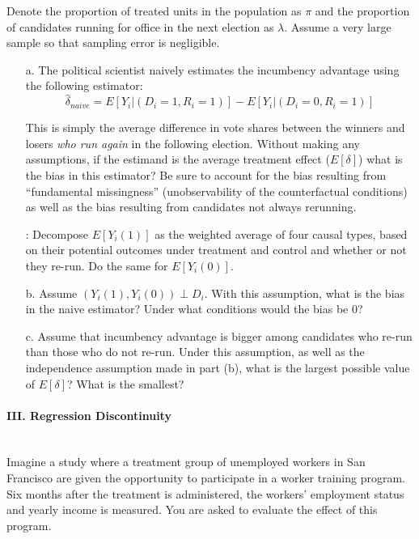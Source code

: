 \documentclass{article}
\begin{document}
Denote the proportion of treated units in the population as $\pi$ and the
proportion of candidates running for office in the next election as
$\lambda$. Assume a very large sample so that sampling error is negligible.

\begin{itemize}
\item[a.]  The political scientist naively estimates the incumbency
  advantage using the following estimator: 
$$\hat{\delta}_{naive} = E[Y_i|(D_i = 1, R_i
= 1)] - E[Y_i|(D_i = 0, R_i = 1)]$$

This is simply the average difference in vote shares between the
winners and losers {\em who run again} in the following
election. Without making any assumptions, if the estimand is the
average treatment effect ($E[\delta]$) what is the bias in this
estimator? Be sure to account for the bias resulting from
``fundamental missingness'' (unobservability of the counterfactual
conditions) as well as the bias resulting from candidates not always
rerunning.


: Decompose $E[Y_i(1)]$ as the weighted average of
four causal types, based on their potential outcomes under treatment
and control and whether or not they re-run. Do the same for
$E[Y_i(0)]$.

\item[b.] Assume $(Y_i(1),Y_i(0)) \perp D_i$. With this assumption,
  what is the bias in the naive estimator? Under what conditions would
  the bias be 0?

\item[c.]  Assume that incumbency advantage is bigger among candidates
  who re-run than those who do not re-run. Under this assumption, as
  well as the independence assumption made in part (b), what is the
  largest possible value of $E[\delta]$? What is the smallest?
\end{itemize}

\paragraph{\Large III. Regression Discontinuity \\ \\}

Imagine a study where a treatment group of unemployed workers in San
Francisco are given the opportunity to participate in a worker
training program. Six months after the treatment is administered, the
workers' employment status and yearly income is measured. You are
asked to evaluate the effect of this program.
\end{document}
